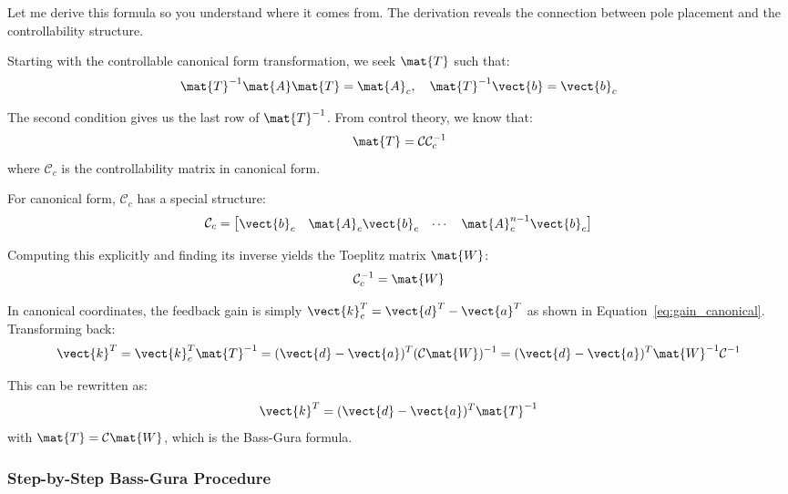 Let me derive this formula so you understand where it comes from. The derivation reveals the connection between pole placement and the controllability structure.

Starting with the controllable canonical form transformation, we seek $\mat{T}$ such that:
\begin{equation}
\mat{T}^{-1}\mat{A}\mat{T} = \mat{A}_c, \quad \mat{T}^{-1}\vect{b} = \vect{b}_c
\end{equation}

The second condition gives us the last row of $\mat{T}^{-1}$. From control theory, we know that:
\begin{equation}
\mat{T} = \mathcal{C}\mathcal{C}_c^{-1}
\end{equation}
where $\mathcal{C}_c$ is the controllability matrix in canonical form.

For canonical form, $\mathcal{C}_c$ has a special structure:
\begin{equation}
\mathcal{C}_c = \begin{bmatrix} \vect{b}_c & \mat{A}_c\vect{b}_c & \cdots & \mat{A}_c^{n-1}\vect{b}_c \end{bmatrix}
\end{equation}

Computing this explicitly and finding its inverse yields the Toeplitz matrix $\mat{W}$:
\begin{equation}
\mathcal{C}_c^{-1} = \mat{W}
\end{equation}

In canonical coordinates, the feedback gain is simply $\vect{k}_c^T = \vect{d}^T - \vect{a}^T$ as shown in Equation~\eqref{eq:gain_canonical}. Transforming back:
\begin{equation}
\vect{k}^T = \vect{k}_c^T\mat{T}^{-1} = (\vect{d} - \vect{a})^T(\mathcal{C}\mat{W})^{-1} = (\vect{d} - \vect{a})^T\mat{W}^{-1}\mathcal{C}^{-1}
\end{equation}

This can be rewritten as:
\begin{equation}
\vect{k}^T = (\vect{d} - \vect{a})^T\mat{T}^{-1}
\end{equation}
with $\mat{T} = \mathcal{C}\mat{W}$, which is the Bass-Gura formula.

\subsubsection{Step-by-Step Bass-Gura Procedure}

